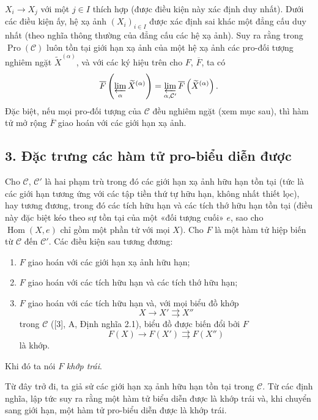 $X_i\longrightarrow X_j$ với một $j\in I$ thích hợp (được điều kiện này xác
định duy nhất). Dưới các điều kiện ấy, hệ xạ ảnh $(X_i)_{i\in I}$ được xác
định sai khác một đẳng cấu duy nhất (theo nghĩa thông thường của đẳng cấu các
hệ xạ ảnh). Suy ra rằng trong $\operatorname{Pro}(\mathcal C)$ luôn tồn tại
giới hạn xạ ảnh của một hệ xạ ảnh các pro-đối tượng nghiêm ngặt
$\widetilde X^{(\alpha)}$, và với các ký hiệu trên cho $F$, $\overline F$, ta
có
\[
  \overline F\left(\varprojlim_\alpha\widetilde X^{(\alpha)}\right)
  =\varprojlim_{\alpha,\mathcal C'}
  \overline F\left(\widetilde X^{(\alpha)}\right).
\]
Đặc biệt, nếu mọi pro-đối tượng của $\mathcal C$ đều nghiêm ngặt (xem mục
sau), thì hàm tử mở rộng $\overline F$ giao hoán với các giới hạn xạ ảnh.

\subsection*{3. Đặc trưng các hàm tử pro-biểu diễn được}

Cho $\mathcal C$, $\mathcal C'$ là hai phạm trù trong đó các giới hạn xạ ảnh
hữu hạn tồn tại (tức là các giới hạn tương ứng với các tập tiền thứ tự hữu
hạn, không nhất thiết lọc), hay tương đương, trong đó các tích hữu hạn và các
tích thớ hữu hạn tồn tại (điều này đặc biệt kéo theo sự tồn tại của một «đối
tượng cuối» $e$, sao cho $\operatorname{Hom}(X,e)$ chỉ gồm một phần tử với
mọi $X$). Cho $F$ là một hàm tử hiệp biến từ $\mathcal C$ đến
$\mathcal C'$. Các điều kiện sau tương đương:

\begin{enumerate}
\item[(i)] $F$ giao hoán với các giới hạn xạ ảnh hữu hạn;
\item[(ii)] $F$ giao hoán với các tích hữu hạn và các tích thớ hữu hạn;
\item[(iii)] $F$ giao hoán với các tích hữu hạn và, với mọi biểu đồ khớp
\[
  X\longrightarrow X'\rightrightarrows X''
\]
trong $\mathcal C$ ([3], A, Định nghĩa 2.1), biểu đồ được biến đổi bởi $F$
\[
  F(X)\longrightarrow F(X')\rightrightarrows F(X'')
\]
là khớp.
\end{enumerate}

Khi đó ta nói $F$ \emph{khớp trái}.

Từ đây trở đi, ta giả sử các giới hạn xạ ảnh hữu hạn tồn tại trong
$\mathcal C$. Từ các định nghĩa, lập tức suy ra rằng một hàm tử biểu diễn
được là khớp trái và, khi chuyển sang giới hạn, một hàm tử pro-biểu diễn được
là khớp trái.

